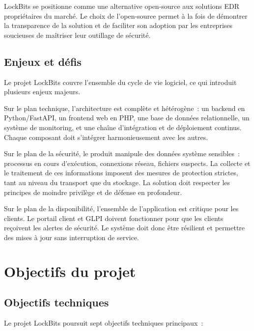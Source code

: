 LockBits se positionne comme une alternative open-source aux solutions
EDR propriétaires du marché. Le choix de l'open-source permet à la fois
de démontrer la transparence de la solution et de faciliter son adoption
par les entreprises soucieuses de maîtriser leur outillage de sécurité.

\subsection{Enjeux et défis}

Le projet LockBits couvre l'ensemble du cycle de vie logiciel, ce qui
introduit plusieurs enjeux majeurs.

Sur le plan technique, l'architecture est complète et hétérogène~: un
backend en Python/FastAPI, un frontend web en PHP, une base de données
relationnelle, un système de monitoring, et une chaîne d'intégration et
de déploiement continus. Chaque composant doit s'intégrer harmonieusement
avec les autres.

Sur le plan de la sécurité, le produit manipule des données système
sensibles~: processus en cours d'exécution, connexions réseau, fichiers
suspects. La collecte et le traitement de ces informations imposent des
mesures de protection strictes, tant au niveau du transport que du
stockage. La solution doit respecter les principes de moindre
privilège et de défense en profondeur.

Sur le plan de la disponibilité, l'ensemble de l'application est
critique pour les clients. Le portail client et GLPI doivent
fonctionner pour que les clients reçoivent les alertes de sécurité.
Le système doit donc être résilient et permettre des mises à jour
sans interruption de service.

\section{Objectifs du projet}

\subsection{Objectifs techniques}

Le projet LockBits poursuit sept objectifs techniques principaux~:


